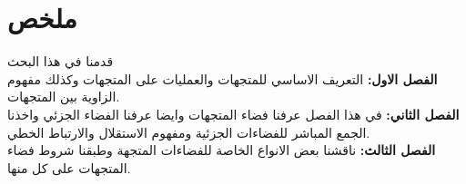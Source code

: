 \chapter*{ملخص}
\noindent
قدمنا في هذا البحث\\
\textbf{الفصل الاول: } التعريف الاساسي للمتجهات والعمليات على المتجهات وكذلك  مفهوم الزاوية بين المتجهات.\\
\textbf{الفصل الثاني: }في هذا الفصل عرفنا فضاء المتجهات وايضا عرفنا الفضاء الجزئي واخذنا الجمع المباشر للفضاءات الجزئية ومفهوم الاستقلال والارتباط الخطي.\\
\textbf{الفصل الثالث:} ناقشنا بعض الانواع الخاصة للفضاءات المتجهة وطبقنا شروط فضاء المتجهات على كل منها.